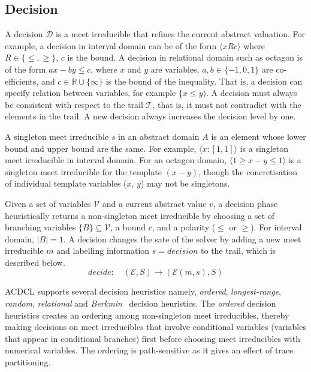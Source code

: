 \subsection{Decision}
A decision $\mathcal{D}$ is a meet irreducible that refines the 
current abstract valuation.  For example, a decision in interval 
domain can be of the form $\langle x R c \rangle$ where 
$R \in \{\leq, \geq\}$, $c$ is the bound.  A decision in 
relational domain such as octagon is of the form $ax - by \leq c$, 
where $x$ and $y$ are variables, $a,b \in \{-1,0,1\}$ are co-efficients, 
and $c \in \mathbb{R}\cup\{\infty\}$ is the bound of the inequality.  
That is, a decision can specify relation between variables, for example 
$\{x \leq y)$.  A decision must always be consistent with respect to 
the trail $\mathcal{T}$, that is, it must not contradict with the elements 
in the trail.  A new decision always increases the decision level by one. 

A singleton meet irreducible $s$ in an abstract domain $A$ is an element 
whose lower bound and upper bound are the same.  For example, 
$\langle x:[1,1] \rangle$ is a singleton meet irreducible in interval domain.  
For an octagon domain, $\langle 1 \geq x-y \leq 1 \rangle$ is a singleton meet 
irreducible for the template $(x-y)$, though the concretisation of individual 
template variables ($x$, $y$) may not be singletons.   

Given a set of variables $\mathcal{V}$ and a current abstract value $v$, 
a decision phase heuristically returns a non-singleton meet irreducible 
by choosing a set of branching variables $\{B\} \subseteq \mathcal{V}$, 
a bound $c$, and a polarity ($\leq$ or $\geq$).  For interval domain, $|B|=1$.  
A decision changes the sate of the solver by adding a new meet irreducible 
$m$ and labelling information $s=decision$ to the trail, which is described below. 
\[decide: \quad (\mathcal{E},S) \rightarrow (\mathcal{E}(m,s),S) \]


ACDCL supports several decision heuristics namely, {\em ordered}, 
{\em longest-range}, {\em random}, {\em relational} and 
{\em Berkmin}~\cite{eugoldberg07} decision heuristics.  
The {\em ordered} decision heuristics creates an ordering among non-singleton 
meet irreducibles, thereby making decisions on meet irreducibles that involve 
conditional variables (variables that appear in conditional branches) first 
before choosing meet irreducibles with numerical variables.  
The ordering is path-sensitive as it gives an effect of trace partitioning.  

